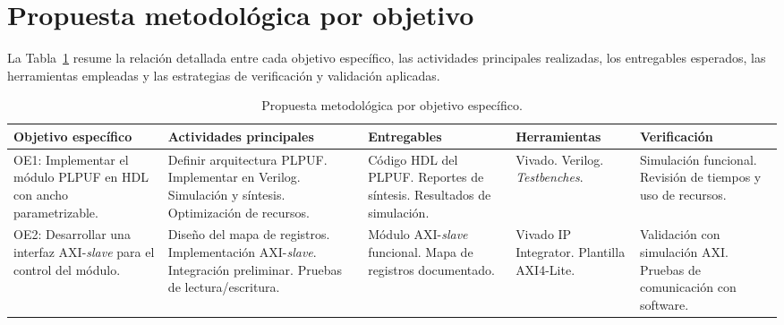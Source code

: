 \section{Propuesta metodológica por objetivo}
\label{sec:metodologia_obj}

La Tabla~\ref{tab:metodologia} resume la relación detallada entre cada
objetivo específico, las actividades principales realizadas, los
entregables esperados, las herramientas empleadas y las estrategias de
verificación y validación aplicadas.

\begin{table}[htbp]
\centering
\caption{Propuesta metodológica por objetivo específico.}
\label{tab:metodologia}
\small
\renewcommand{\arraystretch}{1.3}
\begin{tabular}{|p{3.0cm}|p{3.0cm}|p{2.5cm}|p{2.5cm}|p{2.5cm}|}
\hline
\textbf{Objetivo específico} &
\textbf{Actividades principales} &
\textbf{Entregables} &
\textbf{Herramientas} &
\textbf{Verificación} \\
\hline

OE1: Implementar el módulo PLPUF en HDL con ancho parametrizable. &
Definir arquitectura PLPUF.\newline
Implementar en Verilog.\newline
Simulación y síntesis.\newline
Optimización de recursos. &
Código HDL del PLPUF.\newline
Reportes de síntesis.\newline
Resultados de simulación. &
Vivado.\newline
Verilog.\newline
\textit{Testbenches}. &
Simulación funcional.\newline
Revisión de tiempos y uso de recursos. \\
\hline

OE2: Desarrollar una interfaz AXI-\textit{slave} para el control del módulo. &
Diseño del mapa de registros.\newline
Implementación AXI-\textit{slave}.\newline
Integración preliminar.\newline
Pruebas de lectura/escritura. &
Módulo AXI-\textit{slave} funcional.\newline
Mapa de registros documentado. &
Vivado IP Integrator.\newline
Plantilla AXI4-Lite. &
Validación con simulación AXI.\newline
Pruebas de comunicación con software. \\
\hline


\end{tabular}
\end{table}
